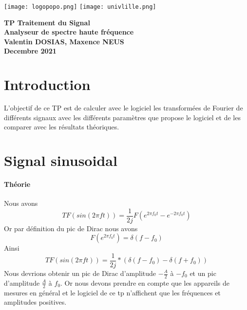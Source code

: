 \documentclass[oneside,a4paper,12pt]{article}
\begin{document}
	\begin{titlepage}
		\texttt{[image: logopopo.png]}
		\hspace*{\fill}
		\texttt{[image: univlille.png]}
		
		\begin{center}
			\vspace{1cm}
			\textbf{TP Traitement du Signal}\\
			\textbf{Analyseur de spectre haute fréquence}\\
			\vspace{1cm}
			\textbf{Valentin DOSIAS, Maxence NEUS}\\
			\vspace{3cm}
			\vspace{\fill}
			\textbf{Decembre 2021}\\
		\end{center}
	\end{titlepage}
	
	\tableofcontents
	
	\vspace{5cm}
	
	\section{Introduction}
	
	L’objectif de ce TP est de calculer avec le logiciel les transformées de Fourier de différents signaux avec les différents paramètres que propose le logiciel et de les comparer avec les résultats théoriques. 
	\newpage
	
	\section{Signal sinusoidal}
	
	\paragraph{Théorie}\paragraph{}
	Nous avons 
	$$ TF(sin(2 \pi f t)) = \frac{1}{2 j}F(e^{2 \pi f_{0} t} - e^{-2 \pi f_{0} t}) $$
	Or par définition du pic de Dirac nous avons
	$$ F(e^{2 \pi f_{0} t})=\delta(f-f_{0}) $$
	Ainsi 
	$$ TF(sin(2 \pi f t)) = \frac{1}{2j}*(\delta(f-f_{0})-\delta(f+f_{0})) $$
	Nous devrions obtenir un pic de Dirac d’amplitude $-\frac{A}{2}$ à $-f_{0}$ et un pic d’amplitude $\frac{A}{2}$ à $f_{0}$. Or nous devons prendre en compte que les appareils de mesures en général et le logiciel de ce tp n’affichent que les fréquences et amplitudes positives.
	
\end{document}
